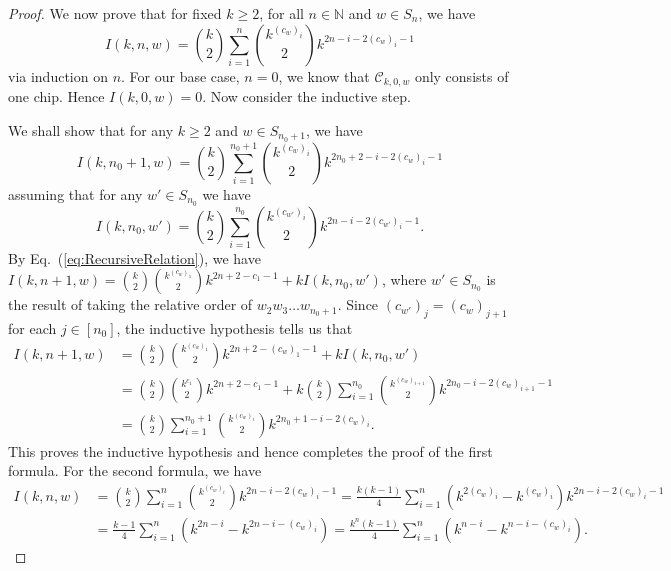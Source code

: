 \documentclass[10pt,a4paper]{amsart}
\begin{document}
\begin{proof}
We now prove that for fixed $k \geq 2$, for all $n \in \mathbb{N}$ and $w \in S_n$, we have
\[I(k, n, w) = \binom{k}{2} \sum_{i=1}^{n}\binom{k^{(c_w)_{i}} }{ 2}k^{2n-i-2(c_w)_i-1}\]
via induction on $n$. For our base case, $n=0$, we know that $\mathcal{C}_{k, 0, w}$ only consists of one chip. Hence $I(k,0, w) = 0$. Now consider the inductive step. 

We shall show that for any $k \geq 2$ and $w \in S_{n_0+1}$, we have
\[I(k, n_0+1, w) = \binom{k}{2} \sum_{i=1}^{n_0+1} \binom{k^{(c_w)_i}}{2}k^{2n_0+2-i-2(c_w)_i-1}\]
assuming that for any $w' \in S_{n_0}$ we have $$I(k, n_0, w') = \binom{k}{2} \sum_{i=1}^{n_0}\binom{k^{(c_{w'})_{i}} }{ 2}k^{2n-i-2(c_{w'})_i-1}.$$
By Eq.~(\ref{eq:RecursiveRelation}), we have $I(k, n+1, w) = \binom{k}{2}\binom{k^{(c_w)_1}}{2}k^{2n+2-c_1-1} + k I(k, n_0, w')$, where $w' \in S_{n_0} $ is the result of taking the relative order of $w_2w_3\dots w_{n_0+1}$. Since $(c_{w'})_{j} = (c_{w})_{j+1}$ for each $j \in [n_0]$, the inductive hypothesis tells us that \begin{equation*}
    \begin{split}
        I(k, n+1, w) &= \binom{k}{2}\binom{k^{(c_w)_1}}{2}k^{2n+2-(c_w)_1-1} + k I(k, n_0, w') \\ &= \binom{k}{2}\binom{k^{c_1}}{2}k^{2n+2-c_1-1} +k \binom{k}{2}\sum_{i=1}^{n_0} \binom{k^{(c_{w})_{i+1}}}{2} k^{2n_0 - i-2(c_w)_{i+1}-1} \\ &= \binom{k}{2}\sum_{i=1}^{n_0+1}\binom{k^{(c_w)_i}}{2}k^{2n_0+1-i-2(c_w)_{i}}.
    \end{split}
\end{equation*} This proves the inductive hypothesis and hence completes the proof of the first formula.
For the second formula, we have
\begin{equation*}
\begin{split}
I(k, n, w) &= \binom{k}{2}\sum_{i=1}^n\binom{k^{(c_w)_i}}{2}k^{2n-i-2(c_w)_i-1} = \frac{k(k-1)}{4}\sum_{i=1}^n (k^{2(c_w)_i}-k^{(c_w)_i})k^{2n-i-2(c_w)_i-1} \\
&= \frac{k-1}{4}\sum_{i=1}^n (k^{2n-i}-k^{2n-i-(c_w)_i}) = \frac{k^n(k-1)}{4}\sum_{i=1}^n(k^{n-i} -k^{n-i-(c_w)_i}).
\end{split}
\end{equation*}\end{proof}
\end{document}
